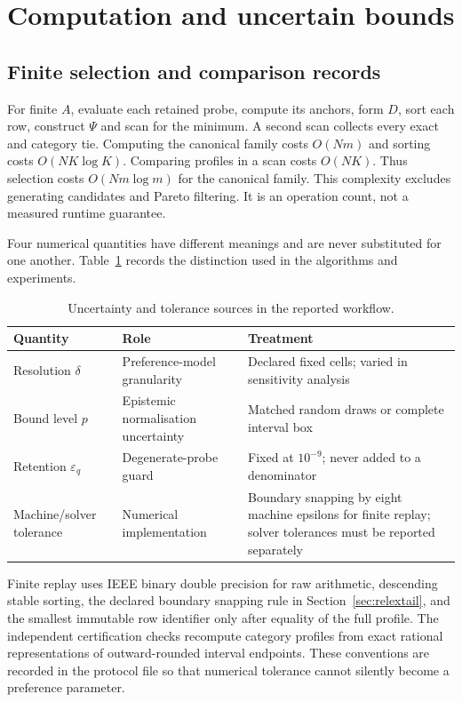 \section{Computation and uncertain bounds}
\label{sec:compute}
\subsection{Finite selection and comparison records}
For finite $A$, evaluate each retained probe, compute its anchors, form $D$, sort each row, construct $\Psi$ and scan for the minimum. A second scan collects every exact and category tie. Computing the canonical family costs $O(Nm)$ and sorting costs $O(NK\log K)$. Comparing profiles in a scan costs $O(NK)$. Thus selection costs $O(Nm\log m)$ for the canonical family. This complexity excludes generating candidates and Pareto filtering. It is an operation count, not a measured runtime guarantee.

Four numerical quantities have different meanings and are never substituted for one another. Table~\ref{tab:uncertainties} records the distinction used in the algorithms and experiments.
\begin{table}[tbp]\centering\small
\caption{Uncertainty and tolerance sources in the reported workflow.}
\label{tab:uncertainties}
\begin{tabular}{@{}p{.20\linewidth}p{.29\linewidth}p{.38\linewidth}@{}}\toprule
Quantity & Role & Treatment\\\midrule
Resolution $\delta$ & Preference-model granularity & Declared fixed cells; varied in sensitivity analysis\\
Bound level $p$ & Epistemic normalisation uncertainty & Matched random draws or complete interval box\\
Retention $\varepsilon_q$ & Degenerate-probe guard & Fixed at $10^{-9}$; never added to a denominator\\
Machine/solver tolerance & Numerical implementation & Boundary snapping by eight machine epsilons for finite replay; solver tolerances must be reported separately\\\bottomrule
\end{tabular}
\end{table}

Finite replay uses IEEE binary double precision for raw arithmetic, descending stable sorting, the declared boundary snapping rule in Section~\ref{sec:relextail}, and the smallest immutable row identifier only after equality of the full profile. The independent certification checks recompute category profiles from exact rational representations of outward-rounded interval endpoints. These conventions are recorded in the protocol file so that numerical tolerance cannot silently become a preference parameter.

